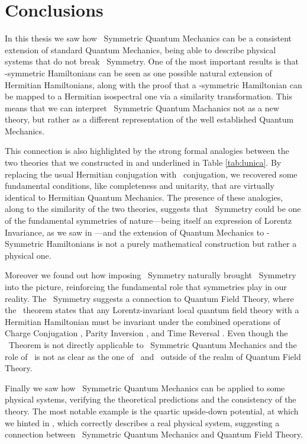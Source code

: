\chapter{Conclusions}\label{ch:conclusions}
    In this thesis we saw how \PT\ Symmetric Quantum Mechanics can be a consistent extension of standard Quantum Mechanics, being able to describe physical systems that do not break \PT\ Symmetry. One of the most important results is that \PT-symmetric Hamiltonians can be seen as one possible natural extension of Hermitian Hamiltonians, along with the proof that a \PT-symmetric Hamiltonian can be mapped to a Hermitian isospectral one via a similarity transformation. This means that we can interpret \PT\ Symmetric Quantum Machanics not as a new theory, but rather as a different representation of the well established Quantum Mechanics.
    
    This connection is also highlighted by the strong formal analogies between the two theories that we constructed in  and underlined in Table \ref{tab:lunica}. By replacing the usual Hermitian conjugation with \CPT\ conjugation, we recovered some fundamental conditions, like completeness and unitarity, that are virtually identical to Hermitian Quantum Mechanics. The presence of these analogies, along to the similarity of the two theories, suggests that \PT\ Symmetry could be one of the fundamental symmetries of nature---being itself an expression of Lorentz Invariance, as we saw in ---and the extension of Quantum Mechanics to \PT-Symmetric Hamiltonians is not a purely mathematical construction but rather a physical one.

    Moreover we found out how imposing \PT\ Symmetry naturally brought \CPT\ Symmetry into the picture, reinforcing the fundamental role that symmetries play in our reality. The \CPT\ Symmetry suggests a connection to Quantum Field Theory, where the \CPT\ theorem states that any Lorentz-invariant local quantum field theory with a Hermitian Hamiltonian must be invariant under the combined operations of Charge Conjugation \hC, Parity Inversion \hP, and Time Reversal \hT. Even though the \CPT\ Theorem is not directly applicable to \PT\ Symmetric Quantum Mechanics and the role of \hC\ is not as clear as the one of \hP\ and \hT\ outside of the realm of Quantum Field Theory.

    Finally we saw how \PT\ Symmetric Quantum Mechanics can be applied to some physical systems, verifying the theoretical predictions and the consistency of the theory. The most notable example is the quartic upside-down potential, at which we hinted in , which correctly describes a real physical system, suggesting a connection between \PT\ Symmetric Quantum Mechanics and Quantum Field Theory.

